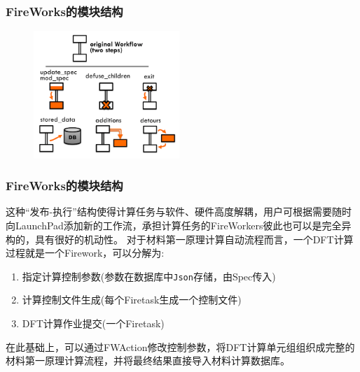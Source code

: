 \documentclass[cjk,slidestop,compress,mathserif,blue]{beamer}
\begin{document}
\frame
{
	\frametitle{\textrm{FireWorks}的模块结构}
\fontsize{8.2pt}{6.2pt}
\begin{figure}[h!]
\centering
\vspace*{-0.10in}
\includegraphics[height=1.9in]{Figures/MP_Fireworks_fwactions.png}
\caption{\fontsize{7.2pt}{4.2pt}}%
\label{FireWorks_FWA}
\end{figure} 
}

\frame
{
	\frametitle{\textrm{FireWorks}的模块结构}
这种“发布-执行”结构使得计算任务与软件、硬件高度解耦，用户可根据需要随时向\textrm{LaunchPad}添加新的工作流，承担计算任务的\textrm{FireWorkers}彼此也可以是完全异构的，具有很好的机动性。
\vskip 0.25in
对于材料第一原理计算自动流程而言，一个\textrm{DFT}计算过程就是一个\textrm{Firework}，可以分解为:
\begin{enumerate}
	\item 指定计算控制参数(参数在数据库中\texttt{Json}存储，由\textrm{Spec}传入)
	\item 计算控制文件生成(每个\textrm{Firetask}生成一个控制文件)
	\item \textrm{DFT}计算作业提交(一个\textrm{Firetask})
\end{enumerate}
在此基础上，可以通过\textrm{FWAction}修改控制参数，将\textrm{DFT}计算单元组组织成完整的材料第一原理计算流程，并将最终结果直接导入材料计算数据库。
}
\end{document}
